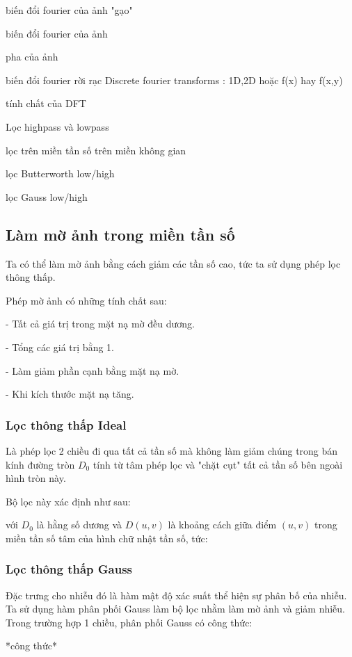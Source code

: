 \documentclass[12pt,a4paper]{report}
\numberwithin{equation}{section}
\theoremstyle{definition} %
\begin{document}
biến đổi fourier của ảnh "gạo"

biến đổi fourier của ảnh

pha của ảnh

biến đổi fourier rời rạc Discrete fourier transforms :  1D,2D hoặc f(x) hay f(x,y)

tính chất của DFT

Lọc highpass và lowpass

lọc trên miền tần số trên miền không gian

lọc Butterworth low/high

lọc Gauss low/high




\subsection{Làm mờ ảnh trong miền tần số}

Ta có thể làm mờ ảnh bằng cách giảm các tần số cao, tức ta sử dụng phép lọc thông thấp.

Phép mờ ảnh có những tính chất sau:

- Tất cả giá trị trong mặt nạ mờ đều dương.

- Tổng các giá trị bằng 1.

- Làm giảm phần cạnh bằng mặt nạ mờ.

- Khi kích thước mặt nạ tăng.

\subsubsection{Lọc thông thấp Ideal}

Là phép lọc 2 chiều đi qua tất cả tần số mà không làm giảm chúng trong bán kính đường tròn $D_0$ tính từ tâm phép lọc và "chặt cụt" tất cả tần số bên ngoài hình tròn này.

Bộ lọc này xác định như sau:

với $D_0$ là hằng số dương và $D(u,v)$ là khoảng cách giữa điểm $(u,v)$ trong miền tần số tâm của hình chữ nhật tần số, tức:
\subsubsection{Lọc thông thấp Gauss}

Đặc trưng cho nhiễu đó là hàm mật độ xác suất thể hiện sự phân bố của nhiễu. Ta sử dụng hàm phân phối Gauss làm bộ lọc nhằm làm mờ ảnh và giảm nhiễu. Trong trường hợp 1 chiều, phân phối Gauss có công thức:

*công thức*
\end{document}
